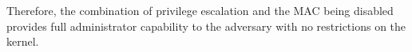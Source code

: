 Therefore, the combination of privilege escalation and the MAC being disabled
provides full administrator capability to the adversary with no restrictions on
the kernel.








